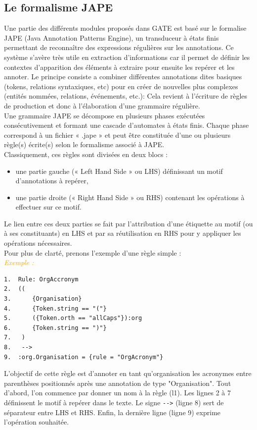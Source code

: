 \documentclass[a4paper, 11pt]{report}
\newenvironment{exemple}
    {
    \textit{\textcolor{orange}{
    Exemple : \\}}
    }
    {~\\
    }
\begin{document}
\subsection{Le formalisme JAPE}
Une partie des différents modules proposés dans GATE est basé sur le formalise JAPE (Java Annotation Patterns Engine), un transduceur à états finis permettant de reconnaître des expressions régulières sur les annotations. Ce système s'avère très utile en extraction d'informations car il permet de définir les contextes d'apparition des éléments à extraire pour ensuite les repérer et les annoter. Le principe consiste a combiner différentes annotations dites basiques (tokens, relations syntaxiques, etc) pour en créer de nouvelles plus complexes (entités nommées, relations, événements, etc.): Cela revient à l'écriture de règles de production et donc à l'élaboration d'une grammaire régulière.\\
Une grammaire JAPE se décompose en plusieurs phases exécutées consécutivement et formant une cascade d'automates à états finis. Chaque phase correspond à un fichier « .jape » et peut être constituée d'une ou plusieurs règle(s) écrite(s) selon le formalisme associé à JAPE. \\
Classiquement, ces règles sont divisées en deux blocs : 
\begin{itemize}
\item une partie gauche (« Left Hand Side » ou LHS) définissant un motif d'annotations à repérer,
\item une partie droite (« Right Hand Side » ou RHS) contenant les opérations à effectuer sur ce motif.
\end{itemize}
Le lien entre ces deux parties se fait par l'attribution d'une étiquette au motif (ou à ses constituants) en LHS et par sa réutilisation en RHS pour y appliquer les opérations nécessaires.\\
Pour plus de clarté, prenons l'exemple d'une règle simple :\\
\begin{exemple}
\begin{verbatim}
1.	Rule: OrgAccronym
2.	((
3.		{Organisation}
4.		{Token.string == "("}
5.		({Token.orth == "allCaps"}):org
6.		{Token.string == ")"}
7.	 )
8.	 -->
9.	:org.Organisation = {rule = "OrgAcronym"}
\end{verbatim}

L'objectif de cette règle est d'annoter en tant qu'organisation les acronymes entre parenthèses positionnés après une annotation de type "Organisation". Tout d'abord, l'on commence par donner un nom à la règle (l1). Les lignes 2 à 7 définissent le motif à repérer dans le texte. Le signe \verb|-->| (ligne 8) sert de séparateur entre LHS et RHS. Enfin, la dernière ligne (ligne 9) exprime l'opération souhaitée.
\end{exemple}
\end{document}
